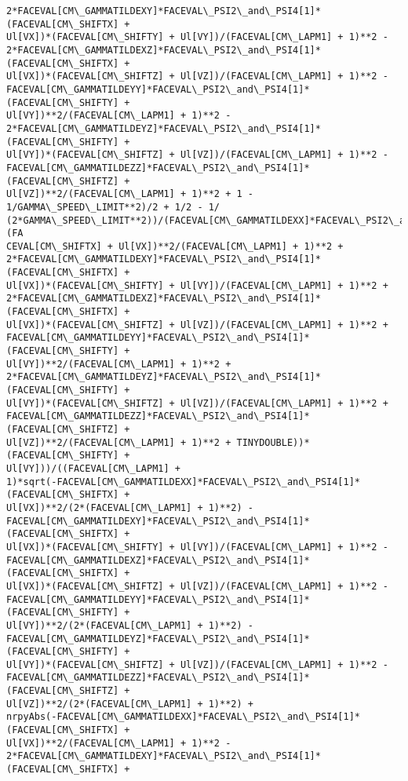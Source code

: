 \documentclass[landscape,letterpaper,10pt,english]{article}
\begin{document}
\begin{Verbatim}[commandchars=\\\{\}]
2*FACEVAL[CM\_GAMMATILDEXY]*FACEVAL\_PSI2\_and\_PSI4[1]*(FACEVAL[CM\_SHIFTX] +
Ul[VX])*(FACEVAL[CM\_SHIFTY] + Ul[VY])/(FACEVAL[CM\_LAPM1] + 1)**2 -
2*FACEVAL[CM\_GAMMATILDEXZ]*FACEVAL\_PSI2\_and\_PSI4[1]*(FACEVAL[CM\_SHIFTX] +
Ul[VX])*(FACEVAL[CM\_SHIFTZ] + Ul[VZ])/(FACEVAL[CM\_LAPM1] + 1)**2 -
FACEVAL[CM\_GAMMATILDEYY]*FACEVAL\_PSI2\_and\_PSI4[1]*(FACEVAL[CM\_SHIFTY] +
Ul[VY])**2/(FACEVAL[CM\_LAPM1] + 1)**2 -
2*FACEVAL[CM\_GAMMATILDEYZ]*FACEVAL\_PSI2\_and\_PSI4[1]*(FACEVAL[CM\_SHIFTY] +
Ul[VY])*(FACEVAL[CM\_SHIFTZ] + Ul[VZ])/(FACEVAL[CM\_LAPM1] + 1)**2 -
FACEVAL[CM\_GAMMATILDEZZ]*FACEVAL\_PSI2\_and\_PSI4[1]*(FACEVAL[CM\_SHIFTZ] +
Ul[VZ])**2/(FACEVAL[CM\_LAPM1] + 1)**2 + 1 - 1/GAMMA\_SPEED\_LIMIT**2)/2 + 1/2 - 1/
(2*GAMMA\_SPEED\_LIMIT**2))/(FACEVAL[CM\_GAMMATILDEXX]*FACEVAL\_PSI2\_and\_PSI4[1]*(FA
CEVAL[CM\_SHIFTX] + Ul[VX])**2/(FACEVAL[CM\_LAPM1] + 1)**2 +
2*FACEVAL[CM\_GAMMATILDEXY]*FACEVAL\_PSI2\_and\_PSI4[1]*(FACEVAL[CM\_SHIFTX] +
Ul[VX])*(FACEVAL[CM\_SHIFTY] + Ul[VY])/(FACEVAL[CM\_LAPM1] + 1)**2 +
2*FACEVAL[CM\_GAMMATILDEXZ]*FACEVAL\_PSI2\_and\_PSI4[1]*(FACEVAL[CM\_SHIFTX] +
Ul[VX])*(FACEVAL[CM\_SHIFTZ] + Ul[VZ])/(FACEVAL[CM\_LAPM1] + 1)**2 +
FACEVAL[CM\_GAMMATILDEYY]*FACEVAL\_PSI2\_and\_PSI4[1]*(FACEVAL[CM\_SHIFTY] +
Ul[VY])**2/(FACEVAL[CM\_LAPM1] + 1)**2 +
2*FACEVAL[CM\_GAMMATILDEYZ]*FACEVAL\_PSI2\_and\_PSI4[1]*(FACEVAL[CM\_SHIFTY] +
Ul[VY])*(FACEVAL[CM\_SHIFTZ] + Ul[VZ])/(FACEVAL[CM\_LAPM1] + 1)**2 +
FACEVAL[CM\_GAMMATILDEZZ]*FACEVAL\_PSI2\_and\_PSI4[1]*(FACEVAL[CM\_SHIFTZ] +
Ul[VZ])**2/(FACEVAL[CM\_LAPM1] + 1)**2 + TINYDOUBLE))*(FACEVAL[CM\_SHIFTY] +
Ul[VY]))/((FACEVAL[CM\_LAPM1] +
1)*sqrt(-FACEVAL[CM\_GAMMATILDEXX]*FACEVAL\_PSI2\_and\_PSI4[1]*(FACEVAL[CM\_SHIFTX] +
Ul[VX])**2/(2*(FACEVAL[CM\_LAPM1] + 1)**2) -
FACEVAL[CM\_GAMMATILDEXY]*FACEVAL\_PSI2\_and\_PSI4[1]*(FACEVAL[CM\_SHIFTX] +
Ul[VX])*(FACEVAL[CM\_SHIFTY] + Ul[VY])/(FACEVAL[CM\_LAPM1] + 1)**2 -
FACEVAL[CM\_GAMMATILDEXZ]*FACEVAL\_PSI2\_and\_PSI4[1]*(FACEVAL[CM\_SHIFTX] +
Ul[VX])*(FACEVAL[CM\_SHIFTZ] + Ul[VZ])/(FACEVAL[CM\_LAPM1] + 1)**2 -
FACEVAL[CM\_GAMMATILDEYY]*FACEVAL\_PSI2\_and\_PSI4[1]*(FACEVAL[CM\_SHIFTY] +
Ul[VY])**2/(2*(FACEVAL[CM\_LAPM1] + 1)**2) -
FACEVAL[CM\_GAMMATILDEYZ]*FACEVAL\_PSI2\_and\_PSI4[1]*(FACEVAL[CM\_SHIFTY] +
Ul[VY])*(FACEVAL[CM\_SHIFTZ] + Ul[VZ])/(FACEVAL[CM\_LAPM1] + 1)**2 -
FACEVAL[CM\_GAMMATILDEZZ]*FACEVAL\_PSI2\_and\_PSI4[1]*(FACEVAL[CM\_SHIFTZ] +
Ul[VZ])**2/(2*(FACEVAL[CM\_LAPM1] + 1)**2) +
nrpyAbs(-FACEVAL[CM\_GAMMATILDEXX]*FACEVAL\_PSI2\_and\_PSI4[1]*(FACEVAL[CM\_SHIFTX] +
Ul[VX])**2/(FACEVAL[CM\_LAPM1] + 1)**2 -
2*FACEVAL[CM\_GAMMATILDEXY]*FACEVAL\_PSI2\_and\_PSI4[1]*(FACEVAL[CM\_SHIFTX] +

\end{Verbatim}
\end{document}
